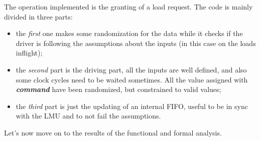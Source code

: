 The operation implemented is the granting of a load request. The code is mainly divided in three parts: 
\begin{itemize}
    \item the \emph{first} one makes some randomization for the data while it checks if the driver is following the assumptions about the inputs (in this case on the loads inflight);
    
    \item the \emph{second} part is the driving part, all the inputs are well defined, and also some clock cycles need to be waited sometimes. All the value assigned with \textbf{\emph{command}} have been randomized, but constrained to valid values;
    
    \item the \emph{third} part is just the updating of an internal FIFO, useful to be in sync with the LMU and to not fail the assumptions.
\end{itemize}  
\bigskip



Let's now move on to the results of the functional and formal analysis.
